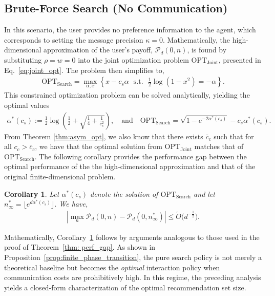\documentclass[12pt]{article}
\newtheorem{corollary}[theorem]{Corollary}
\theoremstyle{definition}
\theoremstyle{remark}
\begin{document}
\subsection{Brute-Force Search (No Communication)} In this scenario, the user provides no preference information to the agent, which corresponds to setting the message precision $\kappa=0$. Mathematically, the high-dimensional approximation of the user's payoff, $\mathcal{P}_d(0,n)$, is found by substituting $\rho = w = 0$ into the joint optimization problem $\text{OPT}_{\text{Joint}}$, presented in Eq.~\eqref{eq:joint_opt}. The problem then simplifies to,
\begin{align*}
    \text{OPT}_{\text{Search}} = \max_{\alpha, x} \left\{ x - c_s \alpha \ \ \ \text{s.t.} \ \ \ \frac{1}{2} \log(1-x^2) = - \alpha \right\}.
\end{align*}
This constrained optimization problem can be solved analytically, yielding the optimal values
\begin{align}
    \alpha^*(c_s) := \frac{1}{2} \log \left( \frac{1}{2} + \sqrt{\frac{1}{4} + \frac{1}{c_s^2}} \right), \quad \text{and} \quad \text{OPT}_{\text{Search}} = \sqrt{1-e^{-2\alpha^*(c_s)}} - c_s \alpha^*(c_s).
\end{align}
From Theorem \ref{thm:asym_opt}, we also know that there exists $\bar c_c$ such that for all $c_c > \bar c_c$, we have that the optimal solution from $\text{OPT}_{\text{Joint}}$ matches that of $\text{OPT}_{\text{Search}}$. The following corollary provides the performance gap between the optimal performance of the the high-dimensional approximation and that of the original finite-dimensional problem.
\begin{corollary}
\label{cor:brute_force_gap}
Let $\alpha^*(c_s)$ denote the solution of $\text{OPT}_{\text{Search}}$ and let $n^*_\infty = \lfloor e^{d \alpha^*(c_s)} \rfloor$. We have,
\begin{align*}
    \left| \max_{n} \mathcal{P}_d(0,n) - \mathcal{P}_d(0,n^*_\infty) \right| \leq \tilde{O}\big(d^{-\frac{1}{2}}\big).
\end{align*}
\end{corollary}
Mathematically, Corollary~\ref{cor:brute_force_gap} follows by arguments analogous to those used in the proof of Theorem~\ref{thm: perf_gap}. As shown in Proposition~\ref{prop:finite_phase_transition}, the pure search policy is not merely a theoretical baseline but becomes the \emph{optimal} interaction policy when communication costs are prohibitively high. In this regime, the preceding analysis yields a closed-form characterization of the optimal recommendation set size.
\end{document}
